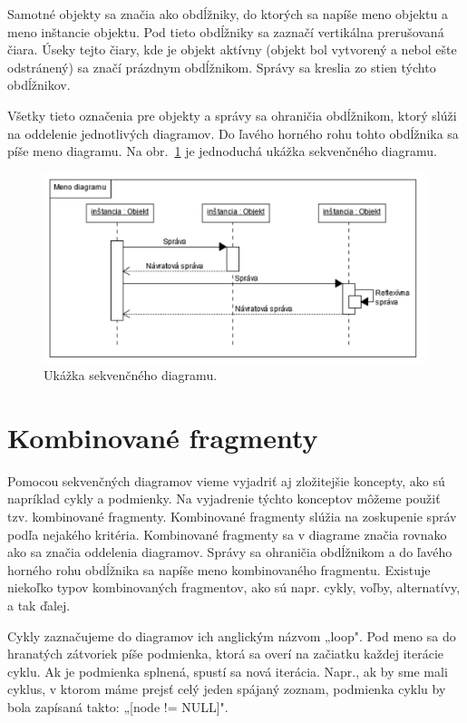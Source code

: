 \documentclass[10pt,slovak,a4paper]{article}
\begin{document}
\noindent Samotné objekty sa značia ako obdĺžniky, do ktorých sa napíše meno objektu a meno inštancie objektu. Pod tieto obdĺžniky sa zaznačí vertikálna prerušovaná čiara. 
Úseky tejto čiary, kde je objekt aktívny (objekt bol vytvorený a nebol ešte odstránený) sa značí prázdnym obdĺžnikom. Správy sa kreslia zo stien týchto obdĺžnikov. \cite{booch00} \newline

\noindent Všetky tieto označenia pre objekty a správy sa ohraničia obdĺžnikom, ktorý slúži na oddelenie jednotlivých diagramov.
Do ľavého horného rohu tohto obdĺžnika sa píše meno diagramu. \cite{booch00}
Na obr.~\ref{diag1} je jednoduchá ukážka sekvenčného diagramu.

\begin{figure}[tbh]
\centering
\includegraphics[scale=0.8]{simple_diag.pdf}
\caption{Ukážka sekvenčného diagramu.\cite{booch00}}
\label{diag1}
\end{figure}

\section{Kombinované fragmenty} \label{frag}

Pomocou sekvenčných diagramov vieme vyjadriť aj zložitejšie koncepty, ako sú napríklad cykly a podmienky. Na vyjadrenie týchto konceptov môžeme použiť tzv. kombinované fragmenty.
Kombinované fragmenty slúžia na zoskupenie správ podľa nejakého kritéria. 
Kombinované fragmenty sa v diagrame značia rovnako ako sa značia oddelenia diagramov. Správy sa ohraničia obdĺžnikom a do ľavého horného rohu obdĺžnika sa napíše meno 
kombinovaného fragmentu. Existuje niekoľko typov kombinovaných fragmentov, ako sú napr. cykly, voľby, alternatívy, a tak ďalej. \cite{booch00} \newline

\noindent Cykly zaznačujeme do diagramov ich anglickým názvom „loop". Pod meno sa do hranatých zátvoriek píše podmienka, ktorá sa overí na začiatku každej iterácie cyklu. 
Ak je podmienka splnená, spustí sa nová iterácia. 
Napr., ak by sme mali cyklus, v ktorom máme prejsť celý jeden spájaný zoznam, podmienka cyklu by bola zapísaná takto: „[node != NULL]". \cite{booch00} \newline
\end{document}
